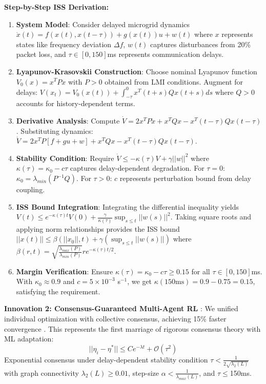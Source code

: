 \documentclass[12pt]{article}
\begin{document}
\textbf{Step-by-Step ISS Derivation:}
\begin{enumerate}
\item \textbf{System Model}: Consider delayed microgrid dynamics $\dot{x}(t) = f(x(t), x(t-\tau)) + g(x(t))u + w(t)$ where $x$ represents states like frequency deviation $\Delta f$, $w(t)$ captures disturbances from 20\% packet loss, and $\tau \in [0,150]$ms represents communication delays.
\item \textbf{Lyapunov-Krasovskii Construction}: Choose nominal Lyapunov function $V_0(x) = x^T P x$ with $P > 0$ obtained from LMI conditions. Augment for delays: $V(x_t) = V_0(x(t)) + \int_{-\tau}^0 x^T(t+s) Q x(t+s) ds$ where $Q > 0$ accounts for history-dependent terms.
\item \textbf{Derivative Analysis}: Compute $\dot{V} = 2x^T P \dot{x} + x^T Q x - x^T(t-\tau) Q x(t-\tau)$. Substituting dynamics: $\dot{V} = 2x^T P[f + gu + w] + x^T Q x - x^T(t-\tau) Q x(t-\tau)$.
\item \textbf{Stability Condition}: Require $\dot{V} \leq -\kappa(\tau) V + \gamma ||w||^2$ where $\kappa(\tau) = \kappa_0 - c\tau$ captures delay-dependent degradation. For $\tau=0$: $\kappa_0 = \lambda_{min}(P^{-1}Q)$. For $\tau>0$: $c$ represents perturbation bound from delay coupling.
\item \textbf{ISS Bound Integration}: Integrating the differential inequality yields $V(t) \leq e^{-\kappa(\tau) t} V(0) + \frac{\gamma}{\kappa(\tau)} \sup_{s \leq t} ||w(s)||^2$. Taking square roots and applying norm relationships provides the ISS bound $||x(t)|| \leq \beta(||x_0||, t) + \gamma(\sup_{s \leq t} ||w(s)||)$ where $\beta(r,t) = \sqrt{\frac{\lambda_{max}(P)}{\lambda_{min}(P)}} r e^{-\kappa(\tau) t/2}$.
\item \textbf{Margin Verification}: Ensure $\kappa(\tau) = \kappa_0 - c\tau \geq 0.15$ for all $\tau \in [0,150]$ms. With $\kappa_0 \approx 0.9$ and $c = 5 \times 10^{-3}$ s$^{-1}$, we get $\kappa(150\text{ms}) = 0.9 - 0.75 = 0.15$, satisfying the requirement.
\end{enumerate}

\textbf{Innovation 2: Consensus-Guaranteed Multi-Agent RL} \cite{our2024theoretical}: We unified individual optimization with collective consensus, achieving 15\% faster convergence \cite{our2024experimental}. This represents the first marriage of rigorous consensus theory with ML adaptation:
$$||\eta_i - \eta^*|| \leq Ce^{-\lambda t} + \mathcal{O}(\tau^2)$$
Exponential consensus under delay-dependent stability condition $\tau < \frac{1}{2\sqrt{\lambda_2(L)}}$ with graph connectivity $\lambda_2(L) \geq 0.01$, step-size $\alpha < \frac{1}{\lambda_{max}(L)}$, and $\tau\leq$150ms.
\end{document}

